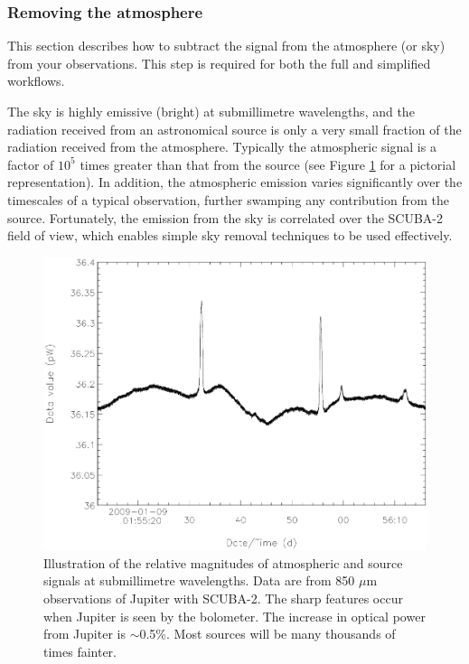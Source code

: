 \documentclass[twoside,11pt]{article}
\newcommand{\xlabel}[1]{}
\renewcommand{\_}{\texttt{\symbol{95}}}
\begin{document}
\subsubsection{\xlabel{skysub}Removing the atmosphere\label{se:skysub}}

This section describes how to subtract the signal from the atmosphere
(or sky) from your observations. This step is required for both the
full and simplified workflows.

The sky is highly emissive (bright) at submillimetre
wavelengths\cite{archibald}, and the radiation received from an
astronomical source is only a very small fraction of the radiation
received from the atmosphere. Typically the atmospheric signal is a
factor of $10^5$ times greater than that from the source (see Figure
\ref{fig:signal} for a pictorial representation). In addition, the
atmospheric emission varies significantly over the timescales of a
typical observation, further swamping any contribution from the
source. Fortunately, the emission from the sky is correlated over the
SCUBA-2 field of view, which enables simple sky removal techniques to
be used effectively\cite{archibald,sc2ana002}.

\begin{figure}[htb]
  \begin{center}
    \includegraphics[width=150mm]{sun258_submmsignal}
    \caption{Illustration of the relative magnitudes of atmospheric
      and source signals at submillimetre wavelengths. Data are from
      850 $\mu$m observations of Jupiter with SCUBA-2. The sharp
      features occur when Jupiter is seen by the bolometer. The
      increase in optical power from Jupiter is $\sim$0.5\%. Most
      sources will be many thousands of times fainter.}
    \label{fig:signal}
  \end{center}
\end{figure}
\end{document}
